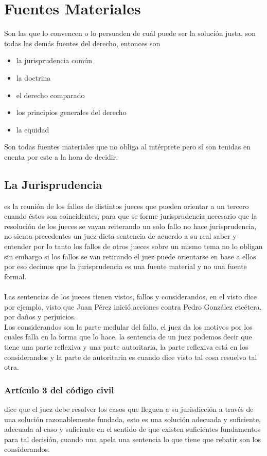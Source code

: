 \documentclass[12pt]{book}
\begin{document}
\section{Fuentes Materiales}Son las que lo convencen o lo persuaden de cuál puede ser la solución justa, son todas las demás fuentes del derecho, entonces son 
\begin{itemize}
\item la jurisprudencia común
\item la doctrina
\item el derecho comparado
\item los principios generales del derecho
\item la equidad
\end{itemize}
Son todas fuentes materiales que no obliga al intérprete pero sí son tenidas en cuenta por este a la hora de decidir.

\subsection{La Jurisprudencia}
es la reunión de los fallos de distintos jueces que pueden orientar a un tercero cuando éstos son coincidentes, para que se forme jurisprudencia necesario que la resolución de los jueces se vayan reiterando un solo fallo no hace jurisprudencia, no sienta precedentes
un juez dicta sentencia de acuerdo a su real saber y entender por lo tanto los fallos de otros jueces sobre un mismo tema no lo obligan sin embargo si los fallos se van retirando el juez puede orientarse en base a ellos
por eso decimos que la jurisprudencia es una fuente material y no una fuente formal.
\\
\\
Las sentencias de los jueces tienen vistos, fallos y considerandos, en el visto dice por ejemplo, visto que Juan Pérez inició acciones contra Pedro González etcétera, por daños y perjuicios.
\\
Los considerandos son la parte medular del fallo, el juez da los motivos por los cuales falla en la forma que lo hace, la sentencia de un juez podemos decir que tiene una parte reflexiva y una parte autoritaria, la parte reflexiva está en los considerandos y la parte de autoritaria es cuando dice visto tal cosa resuelvo tal otra.

\subsubsection{Artículo 3 del código civil} dice que el juez debe resolver los casos que lleguen a su jurisdicción a través de una solución razonablemente fundada, esto es una solución adecuada y suficiente, adecuada al caso y suficiente en el sentido de que existen suficientes fundamentos para tal decisión, cuando una apela una sentencia lo que tiene que rebatir son los considerandos.
\end{document}
